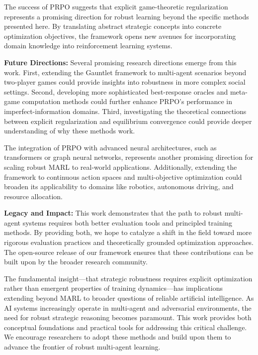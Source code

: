 \documentclass[sigconf,anonymous]{aamas}
\begin{document}
The success of PRPO suggests that explicit game-theoretic regularization represents a promising direction for robust learning beyond the specific methods presented here. By translating abstract strategic concepts into concrete optimization objectives, the framework opens new avenues for incorporating domain knowledge into reinforcement learning systems.

\textbf{Future Directions:} Several promising research directions emerge from this work. First, extending the Gauntlet framework to multi-agent scenarios beyond two-player games could provide insights into robustness in more complex social settings. Second, developing more sophisticated best-response oracles and meta-game computation methods could further enhance PRPO's performance in imperfect-information domains. Third, investigating the theoretical connections between explicit regularization and equilibrium convergence could provide deeper understanding of why these methods work.

The integration of PRPO with advanced neural architectures, such as transformers or graph neural networks, represents another promising direction for scaling robust MARL to real-world applications. Additionally, extending the framework to continuous action spaces and multi-objective optimization could broaden its applicability to domains like robotics, autonomous driving, and resource allocation.

\textbf{Legacy and Impact:} This work demonstrates that the path to robust multi-agent systems requires both better evaluation tools and principled training methods. By providing both, we hope to catalyze a shift in the field toward more rigorous evaluation practices and theoretically grounded optimization approaches. The open-source release of our framework ensures that these contributions can be built upon by the broader research community.

The fundamental insight—that strategic robustness requires explicit optimization rather than emergent properties of training dynamics—has implications extending beyond MARL to broader questions of reliable artificial intelligence. As AI systems increasingly operate in multi-agent and adversarial environments, the need for robust strategic reasoning becomes paramount. This work provides both conceptual foundations and practical tools for addressing this critical challenge. We encourage researchers to adopt these methods and build upon them to advance the frontier of robust multi-agent learning.

\end{document}
